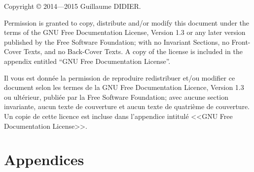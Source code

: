 
\title{\TSwiftTitle}

\newcommand{\TSwiftRoot}[0]{.} %


\frontmatter
\maketitle
\begin{otherlanguage}{english}
Copyright \copyright{}  2014---2015 Guillaume DIDIER.

Permission is granted to copy, distribute and/or modify this document
under the terms of the GNU Free Documentation License, Version 1.3
or any later version published by the Free Software Foundation;
with no Invariant Sections, no Front-Cover Texts, and no Back-Cover Texts.
A copy of the license is included in the appendix entitled ``GNU
Free Documentation License''.
\end{otherlanguage}

Il vous est donnée la permission de reproduire redistribuer et/ou modifier ce document selon les termes de la GNU Free Documentation Licence, Version 1.3 ou ultérieur, publiée par la Free Software Foundation; avec aucune section invariante, aucun texte de couverture et aucun texte de quatrième de couverture.
Un copie de cette licence est incluse dans l'appendice intitulé <<GNU Free Documentation License>>.



\tableofcontents


\mainmatter


\appendix
\part*{Appendices}


\backmatter


